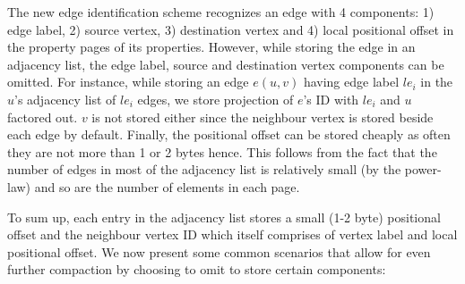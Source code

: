 The new edge identification scheme recognizes an edge with 4 components: 1) edge label, 2) source vertex, 3) destination vertex and 4) local positional offset in the property pages of its properties. However, while storing the edge in an adjacency list, the edge label, source and destination vertex components can be omitted. For instance, while storing an edge $e(u,v)$ having edge label $le_i$ in the $u$'s adjacency list of $le_i$ edges, we store projection of $e$'s ID with $le_i$ and $u$ factored out. $v$ is not stored either since the neighbour vertex is stored beside each edge by default. Finally, the positional offset can be stored cheaply as often they are not more than 1 or 2 bytes hence. This follows from the fact that the number of edges in most of the adjacency list is relatively small (by the power-law) and so are the number of elements in each page. 

To sum up, each entry in the adjacency list stores a small (1-2 byte) positional offset and the neighbour vertex ID which itself comprises of vertex label and local positional offset. We now present some common scenarios that allow for even further compaction by choosing to omit to store certain components:

